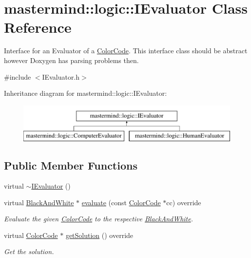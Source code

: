 \hypertarget{classmastermind_1_1logic_1_1_i_evaluator}{}\section{mastermind\+:\+:logic\+:\+:I\+Evaluator Class Reference}
\label{classmastermind_1_1logic_1_1_i_evaluator}


Interface for an Evaluator of a \hyperlink{classmastermind_1_1logic_1_1_color_code}{Color\+Code}. This interface class should be abstract however Doxygen has parsing problems then.  




{\ttfamily \#include $<$I\+Evaluator.\+h$>$}

Inheritance diagram for mastermind\+:\+:logic\+:\+:I\+Evaluator\+:\begin{figure}[H]
\begin{center}
\leavevmode
\includegraphics[height=2.000000cm]{classmastermind_1_1logic_1_1_i_evaluator}
\end{center}
\end{figure}
\subsection*{Public Member Functions}
\begin{DoxyCompactItemize}
\item 
virtual \hyperlink{classmastermind_1_1logic_1_1_i_evaluator_a77766402180f37bce062b808feb5cee6}{$\sim$\+I\+Evaluator} ()
\item 
virtual \hyperlink{classmastermind_1_1logic_1_1_black_and_white}{Black\+And\+White} $\ast$ \hyperlink{classmastermind_1_1logic_1_1_i_evaluator_a1ac9459cbb3698affa4154388b019f09}{evaluate} (const \hyperlink{classmastermind_1_1logic_1_1_color_code}{Color\+Code} $\ast$cc) override
\begin{DoxyCompactList}\small\item\em Evaluate the given \hyperlink{classmastermind_1_1logic_1_1_color_code}{Color\+Code} to the respective \hyperlink{classmastermind_1_1logic_1_1_black_and_white}{Black\+And\+White}. \end{DoxyCompactList}\item 
virtual \hyperlink{classmastermind_1_1logic_1_1_color_code}{Color\+Code} $\ast$ \hyperlink{classmastermind_1_1logic_1_1_i_evaluator_a544ecf5ba1d2cb5708e62fc508d341f3}{get\+Solution} () override
\begin{DoxyCompactList}\small\item\em Get the solution. \end{DoxyCompactList}\end{DoxyCompactItemize}


